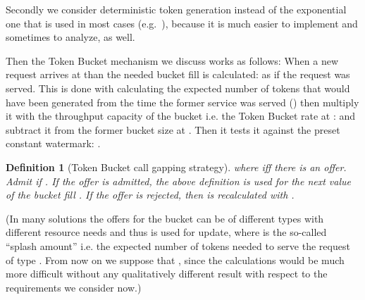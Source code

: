 \documentclass[conference]{IEEEtran}
\newtheorem{definition}{Definition}
\begin{document}
Secondly we consider deterministic token generation instead of the
exponential one that is used in most cases (e.g.~\cite{H.248.11}),
because it is much easier to implement and sometimes to analyze, as
well.

Then the Token Bucket mechanism we discuss works as follows: When a
new request arrives at  than the needed bucket fill is
calculated:  as if the request was served. This is done with
calculating the expected number of tokens that would have been
generated from the time the former service was served ()
then multiply it with the throughput capacity of the bucket i.e. the
Token Bucket rate at :  and subtract it from the former
bucket size at . Then it tests it against the preset
constant watermark: .
\begin{definition}[Token Bucket call gapping strategy
]

where  iff there is an offer. Admit if . If
the offer is admitted, the above definition is used for the next
value of the bucket fill . If the offer is rejected, then
 is recalculated with .
\end{definition}

(In many solutions the offers for the bucket can be of different
types with different resource needs and thus  is used
for update, where  is the so-called ``splash amount'' i.e. the
expected number of tokens needed to serve the request of type .
From now on we suppose that , since the calculations would be
much more difficult without any qualitatively different result with
respect to the requirements we consider now.)
\end{document}
